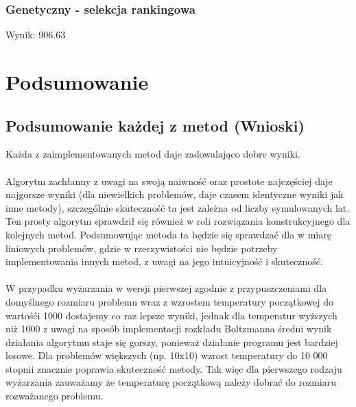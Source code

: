 \documentclass{article}
\begin{document}
\subsubsection{Genetyczny - selekcja rankingowa}
Wynik: 906.63

\section{Podsumowanie}
\subsection{Podsumowanie każdej z metod (Wnioski)}
Każda z zaimplementowanych metod daje zadowalająco dobre wyniki.
\\\\Algorytm zachłanny z uwagi na swoją naiwność oraz prostote najczęściej daje najgorsze wyniki (dla niewielkich problemów, daje czasem identyczne wyniki jak inne metody), szczególnie skuteczność ta jest zależna od liczby symulowanych lat. Ten prosty algorytm sprawdził się również w roli rozwiązania konstrukcyjnego dla kolejnych metod. Podsumowując metoda ta będzie się sprawdzać dla w miarę liniowych problemów, gdzie w rzeczywistości nie będzie potrzeby implementowania innych metod, z uwagi na jego intuicyjność i skuteczność.
\\\\W przypadku wyżarzania w wersji pierwszej zgodnie z przypuszczeniami dla domyślnego rozmiaru problemu wraz z wzrostem temperatury początkowej do wartośći 1000 dostajemy co raz lepsze wyniki, jednak dla temperatur wyższych niż 1000 z uwagi na sposób implementacji rozkładu Boltzmanna średni wynik działania algorytmu staje się gorszy, ponieważ działanie programu jest bardziej losowe. Dla problemów większych (np. 10x10) wzrost temperatury do 10 000 stopnii znacznie poprawia skuteczność metody. Tak więc dla pierwszego rodzaju wyżarzania zauważamy że temperaturę początkową należy dobrać do rozmiaru rozważanego problemu.
\end{document}
